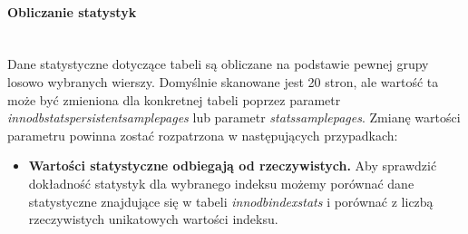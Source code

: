 \paragraph{Obliczanie statystyk}\mbox{}\\
Dane statystyczne dotyczące tabeli są obliczane na podstawie pewnej grupy losowo wybranych wierszy. Domyślnie skanowane jest 20 stron, ale wartość ta może być zmieniona dla konkretnej tabeli poprzez parametr \newline \textit{innodb\textunderscore stats\textunderscore persistent\textunderscore sample\textunderscore pages} lub parametr \textit{stats\textunderscore sample\textunderscore pages}. Zmianę wartości parametru powinna zostać rozpatrzona w następujących przypadkach:
\begin{itemize}
	\item \textbf{Wartości statystyczne odbiegają od rzeczywistych.} \linebreak
	Aby sprawdzić dokładność statystyk dla wybranego indeksu możemy porównać dane statystyczne znajdujące się w tabeli \textit{innodb\textunderscore index\textunderscore stats} i porównać z liczbą rzeczywistych unikatowych wartości indeksu.
	

\end{itemize}
